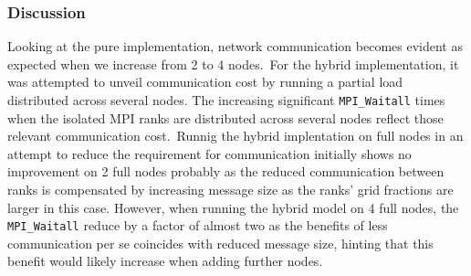 \documentclass[11pt,a4paper]{article}
\begin{document}
\subsubsection{Discussion}
Looking at the pure implementation, network communication becomes evident as expected when we
increase from 2 to 4 nodes.\
For the hybrid implementation, it was attempted to unveil communication cost by running
a partial load distributed across several nodes. The increasing significant \texttt{MPI\_Waitall} times
when the isolated MPI ranks are distributed across several nodes reflect those relevant communication cost.\
Runnig the hybrid implentation on full nodes in an attempt to reduce the requirement for communication
initially shows no improvement on 2 full nodes probably as the reduced communication between ranks
is compensated by increasing message size as the ranks' grid fractions are larger in this case.
However, when running the hybrid model on 4 full nodes, the \texttt{MPI\_Waitall} reduce by a factor of 
almost two as the benefits of less communication per se coincides with reduced message size, hinting that this
benefit would likely increase when adding further nodes.





	


\appendix
\end{document}
